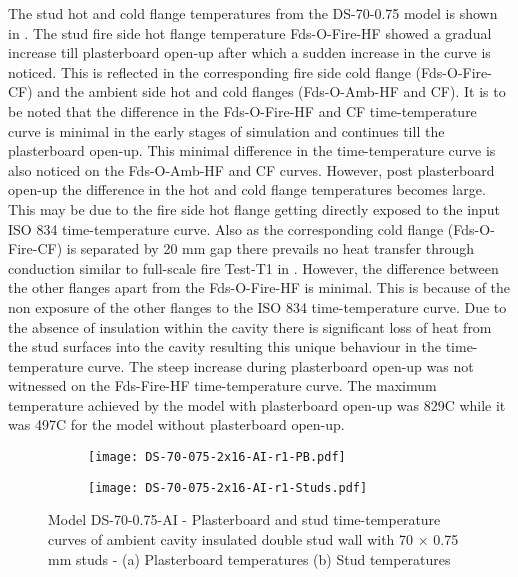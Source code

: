 The stud hot and cold flange temperatures from the DS-70-0.75 model is shown in . The stud fire side hot flange temperature Fds-O-Fire-HF showed a gradual increase till plasterboard open-up after which a sudden increase in the curve is noticed. This is reflected in the corresponding fire side cold flange (Fds-O-Fire-CF) and the ambient side hot and cold flanges (Fds-O-Amb-HF and CF). It is to be noted that the difference in the Fds-O-Fire-HF and CF time-temperature curve is minimal in the early stages of simulation and continues till the plasterboard open-up. This minimal difference in the time-temperature curve is also noticed on the Fds-O-Amb-HF and CF curves. However, post plasterboard open-up the difference in the hot and cold flange temperatures becomes large. This may be due to the fire side hot flange getting directly exposed to the input ISO 834 time-temperature curve. Also as the corresponding cold flange (Fds-O-Fire-CF) is separated by 20 mm gap there prevails no heat transfer through conduction similar to full-scale fire Test-T1 in . However, the difference between the other flanges apart from the Fds-O-Fire-HF is minimal. This is because of the non exposure of the other flanges to the ISO 834 time-temperature curve. Due to the absence of insulation within the cavity there is significant loss of heat from the stud surfaces into the cavity resulting this unique behaviour in the time-temperature curve. The steep increase during plasterboard open-up was not witnessed on the Fds-Fire-HF time-temperature curve. The maximum temperature achieved by the model with plasterboard open-up was 829\degree C while it was 497\degree C for the model without plasterboard open-up. 
\begin{figure}[!htbp]
	\centering
	\begin{subfigure}[b]{0.6\textwidth}
		\centering
		\texttt{[image: DS-70-075-2x16-AI-r1-PB.pdf]}
		\caption{}
		\label{subfig:DS-70-075-2x16-AI-r1-PB}
	\end{subfigure}
	\begin{subfigure}[b]{0.6\textwidth}
		\centering
		\texttt{[image: DS-70-075-2x16-AI-r1-Studs.pdf]}
		\caption{}
		\label{subfig:DS-70-075-2x16-AI-r1-Studs}
	\end{subfigure}
	   \caption{Model DS-70-0.75-AI - Plasterboard and stud time-temperature curves of ambient cavity insulated double stud wall with 70 $\times$ 0.75 mm studs - (a) Plasterboard temperatures (b) Stud temperatures}
	   \label{fig:DS-70-075-2x16-AI-r1}
\end{figure} 


